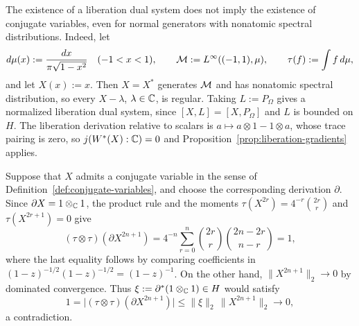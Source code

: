 \begin{remark}\label{rem:liberation-without-conjugates}
The existence of a liberation dual system does not imply the existence of conjugate variables, even for normal generators with nonatomic spectral distributions.
Indeed, let
\[
 d\mu(x):=\frac{dx}{\pi\sqrt{1-x^2}}\quad(-1<x<1),\qquad
 \mathcal M:=L^\infty((-1,1),\mu),\qquad \tau(f):=\int f\,d\mu,
\]
and let $X(x):=x$.
Then $X=X^*$ generates $\mathcal M$ and has nonatomic spectral distribution, so every $X-\lambda$, $\lambda\in\mathbb C$, is regular.
Taking $L:=P_\Omega$ gives a normalized liberation dual system, since $[X,L]=[X,P_\Omega]$ and $L$ is bounded on $H$.
The liberation derivation relative to scalars is $a\mapsto a\otimes1-1\otimes a$, whose trace pairing is zero, so $j(W^*(X):\mathbb C)=0$ and Proposition~\ref{prop:liberation-gradients} applies.

Suppose that $X$ admits a conjugate variable in the sense of Definition~\ref{def:conjugate-variables}, and choose the corresponding derivation $\partial$.
Since $\partial X=1\otimes_{\mathbb C}1$, the product rule and the moments $\tau(X^{2r})=4^{-r}\binom{2r}{r}$ and $\tau(X^{2r+1})=0$ give
\[
 (\tau\otimes\tau)(\partial X^{2n+1})
 =4^{-n}\sum_{r=0}^{n}\binom{2r}{r}\binom{2n-2r}{n-r}=1,
\]
where the last equality follows by comparing coefficients in $(1-z)^{-1/2}(1-z)^{-1/2}=(1-z)^{-1}$.
On the other hand, $\|X^{2n+1}\|_2\to0$ by dominated convergence.
Thus $\xi:=\partial^*(1\otimes_{\mathbb C}1)\in H$ would satisfy
\[
 1=\bigl|(\tau\otimes\tau)(\partial X^{2n+1})\bigr|
 \leq\|\xi\|_2\,\|X^{2n+1}\|_2\longrightarrow0,
\]
a contradiction.
\end{remark}
